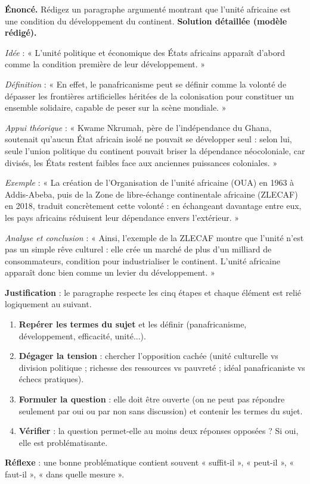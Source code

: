 \documentclass[11pt]{article}
\newcommand{\cle}[1]{{\popxbold\color{popdark}#1}}
\newcounter{popsec}
\newcounter{popsub}
\newcommand{\courssub}[1]{%
  \stepcounter{popsub}%
  \par\vspace{9pt}\noindent{\popxbold\fontsize{11.5}{13}\selectfont\color{popink}{\color{poporange}\thepopsec.\thepopsub}\hspace{6pt}#1}\par\nopagebreak\vspace{4pt}
}
\begin{document}
\begin{exoresolu}
\textbf{Énoncé.} Rédigez un paragraphe argumenté montrant que l'unité africaine est une condition du développement du continent.
\tcblower
\textbf{Solution détaillée (modèle rédigé).}

\emph{Idée} : « L'unité politique et économique des États africains apparaît d'abord comme la condition première de leur développement. »

\emph{Définition} : « En effet, le \cle{panafricanisme} peut se définir comme la volonté de dépasser les frontières artificielles héritées de la colonisation pour constituer un ensemble solidaire, capable de peser sur la scène mondiale. »

\emph{Appui théorique} : « Kwame Nkrumah, père de l'indépendance du Ghana, soutenait qu'aucun État africain isolé ne pouvait se développer seul : selon lui, seule l'union politique du continent pouvait briser la dépendance néocoloniale, car divisés, les États restent faibles face aux anciennes puissances coloniales. »

\emph{Exemple} : « La création de l'Organisation de l'unité africaine (OUA) en 1963 à Addis-Abeba, puis de la Zone de libre-échange continentale africaine (ZLECAF) en 2018, traduit concrètement cette volonté : en échangeant davantage entre eux, les pays africains réduisent leur dépendance envers l'extérieur. »

\emph{Analyse et conclusion} : « Ainsi, l'exemple de la ZLECAF montre que l'unité n'est pas un simple rêve culturel : elle crée un marché de plus d'un milliard de consommateurs, condition pour industrialiser le continent. L'unité africaine apparaît donc bien comme un levier du développement. »

\textbf{Justification} : le paragraphe respecte les cinq étapes et chaque élément est relié logiquement au suivant.
\end{exoresolu}

\courssub{Méthode 4 : Problématiser un sujet}

\begin{methode}
\begin{enumerate}
\item \textbf{Repérer les termes du sujet} et les définir (panafricanisme, développement, efficacité, unité...).
\item \textbf{Dégager la tension} : chercher l'opposition cachée (unité culturelle vs division politique ; richesse des ressources vs pauvreté ; idéal panafricaniste vs échecs pratiques).
\item \textbf{Formuler la question} : elle doit être ouverte (on ne peut pas répondre seulement par oui ou par non sans discussion) et contenir les termes du sujet.
\item \textbf{Vérifier} : la question permet-elle au moins deux réponses opposées ? Si oui, elle est problématisante.
\end{enumerate}
\textbf{Réflexe} : une bonne problématique contient souvent « suffit-il », « peut-il », « faut-il », « dans quelle mesure ».
\end{methode}
\end{document}
